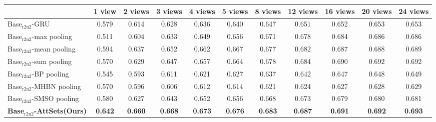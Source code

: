 \documentclass[twocolumn]{svjour3}    \pdfoutput=1
\newcommand{\nickname}{AttSets}
\begin{document}
\begin{table*}[t]
\caption{Group 3: mean IoU for multi-view reconstruction of all 13 categories in ShapeNet$_{\textrm{r2n2}}$ testing split. All networks are firstly trained given only 1 image for each object in Stage 1. The \nickname{} module is further trained given \textbf{16 images} per object in Stage 2, while other competing approaches are fine-tuned given \textbf{16 images} per object in Stage 2.}
\centering
\label{tab:iou_r2n2_16v}
\tabcolsep=0.125cm
\begin{tabular}{ l|cccccccccc}
\hline
&1 view&2 views&3 views& 4 views&5 views&8 views&12 views&16 views&20 views&24 views \\
\hline
Base$_{\textrm{r2n2}}$-GRU &0.579&0.614&0.628&0.636&0.640&0.647&0.651&0.652&0.653&0.653 \\
Base$_{\textrm{r2n2}}$-max pooling &0.511&0.604&0.633&0.649&0.656&0.671&0.678&0.684&0.686&0.686 \\
Base$_{\textrm{r2n2}}$-mean pooling &0.594&0.637&0.652&0.662&0.667&0.677&0.682&0.687&0.688&0.689 \\
Base$_{\textrm{r2n2}}$-sum pooling &0.570&0.629&0.647&0.657&0.664&0.678&0.684&0.690&0.692&0.692 \\
Base$_{\textrm{r2n2}}$-BP pooling &0.545&0.593&0.611&0.621&0.627&0.637&0.642&0.647&0.648&0.649 \\
Base$_{\textrm{r2n2}}$-MHBN pooling &0.570&0.596&0.606&0.612&0.614&0.621&0.624&0.627&0.628&0.629 \\
Base$_{\textrm{r2n2}}$-SMSO pooling &0.580&0.627&0.643&0.652&0.656&0.668&0.673&0.679&0.680&0.681 \\
\textbf{Base$_{\textrm{r2n2}}$-\nickname{}(Ours)} &\textbf{0.642}&\textbf{0.660}&\textbf{0.668}&\textbf{0.673}&\textbf{0.676}&\textbf{0.683}
&\textbf{0.687}&\textbf{0.691}&\textbf{0.692}&\textbf{0.693} \\
\hline
\end{tabular}
\vspace{-0.1 cm}
\end{table*}
\end{document}
